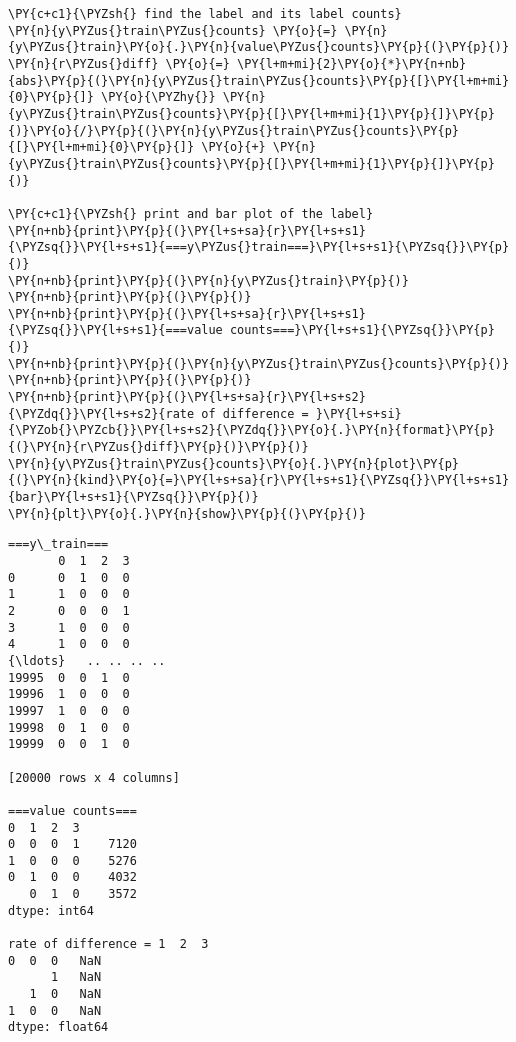     \begin{tcolorbox}[breakable, size=fbox, boxrule=1pt, pad at break*=1mm,colback=cellbackground, colframe=cellborder]
\begin{Verbatim}[commandchars=\\\{\}]
\PY{c+c1}{\PYZsh{} find the label and its label counts}
\PY{n}{y\PYZus{}train\PYZus{}counts} \PY{o}{=} \PY{n}{y\PYZus{}train}\PY{o}{.}\PY{n}{value\PYZus{}counts}\PY{p}{(}\PY{p}{)}
\PY{n}{r\PYZus{}diff} \PY{o}{=} \PY{l+m+mi}{2}\PY{o}{*}\PY{n+nb}{abs}\PY{p}{(}\PY{n}{y\PYZus{}train\PYZus{}counts}\PY{p}{[}\PY{l+m+mi}{0}\PY{p}{]} \PY{o}{\PYZhy{}} \PY{n}{y\PYZus{}train\PYZus{}counts}\PY{p}{[}\PY{l+m+mi}{1}\PY{p}{]}\PY{p}{)}\PY{o}{/}\PY{p}{(}\PY{n}{y\PYZus{}train\PYZus{}counts}\PY{p}{[}\PY{l+m+mi}{0}\PY{p}{]} \PY{o}{+} \PY{n}{y\PYZus{}train\PYZus{}counts}\PY{p}{[}\PY{l+m+mi}{1}\PY{p}{]}\PY{p}{)}

\PY{c+c1}{\PYZsh{} print and bar plot of the label}
\PY{n+nb}{print}\PY{p}{(}\PY{l+s+sa}{r}\PY{l+s+s1}{\PYZsq{}}\PY{l+s+s1}{===y\PYZus{}train===}\PY{l+s+s1}{\PYZsq{}}\PY{p}{)}
\PY{n+nb}{print}\PY{p}{(}\PY{n}{y\PYZus{}train}\PY{p}{)}
\PY{n+nb}{print}\PY{p}{(}\PY{p}{)}
\PY{n+nb}{print}\PY{p}{(}\PY{l+s+sa}{r}\PY{l+s+s1}{\PYZsq{}}\PY{l+s+s1}{===value counts===}\PY{l+s+s1}{\PYZsq{}}\PY{p}{)}
\PY{n+nb}{print}\PY{p}{(}\PY{n}{y\PYZus{}train\PYZus{}counts}\PY{p}{)}
\PY{n+nb}{print}\PY{p}{(}\PY{p}{)}
\PY{n+nb}{print}\PY{p}{(}\PY{l+s+sa}{r}\PY{l+s+s2}{\PYZdq{}}\PY{l+s+s2}{rate of difference = }\PY{l+s+si}{\PYZob{}\PYZcb{}}\PY{l+s+s2}{\PYZdq{}}\PY{o}{.}\PY{n}{format}\PY{p}{(}\PY{n}{r\PYZus{}diff}\PY{p}{)}\PY{p}{)}
\PY{n}{y\PYZus{}train\PYZus{}counts}\PY{o}{.}\PY{n}{plot}\PY{p}{(}\PY{n}{kind}\PY{o}{=}\PY{l+s+sa}{r}\PY{l+s+s1}{\PYZsq{}}\PY{l+s+s1}{bar}\PY{l+s+s1}{\PYZsq{}}\PY{p}{)}
\PY{n}{plt}\PY{o}{.}\PY{n}{show}\PY{p}{(}\PY{p}{)}
\end{Verbatim}
\end{tcolorbox}

    \begin{Verbatim}[commandchars=\\\{\}]
===y\_train===
       0  1  2  3
0      0  1  0  0
1      1  0  0  0
2      0  0  0  1
3      1  0  0  0
4      1  0  0  0
{\ldots}   .. .. .. ..
19995  0  0  1  0
19996  1  0  0  0
19997  1  0  0  0
19998  0  1  0  0
19999  0  0  1  0

[20000 rows x 4 columns]

===value counts===
0  1  2  3
0  0  0  1    7120
1  0  0  0    5276
0  1  0  0    4032
   0  1  0    3572
dtype: int64

rate of difference = 1  2  3
0  0  0   NaN
      1   NaN
   1  0   NaN
1  0  0   NaN
dtype: float64
    \end{Verbatim}

